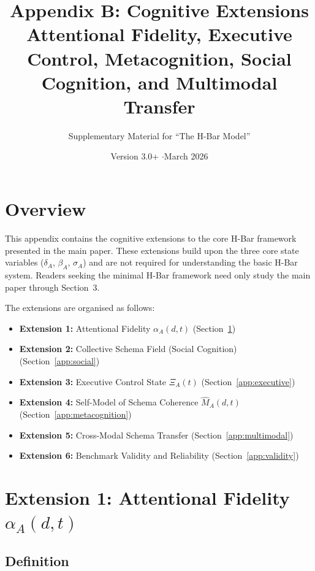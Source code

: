 \documentclass[11pt,a4paper]{article}
\title{\textbf{Appendix B: Cognitive Extensions}\\[6pt]
\large Attentional Fidelity, Executive Control, Metacognition, Social Cognition, and Multimodal Transfer}
\author{Supplementary Material for ``The H-Bar Model''}
\date{Version 3.0+ \quad$\cdot$\quad March 2026}
\begin{document}
\maketitle

\section*{Overview}\label{app:overview}

This appendix contains the cognitive extensions to the core H-Bar
framework presented in the main paper. These extensions build upon
the three core state variables ($\delta_A$, $\beta_A$, $\sigma_A$)
and are not required for understanding the basic H-Bar system.
Readers seeking the minimal H-Bar framework need only study the
main paper through Section~3.

The extensions are organised as follows:
\begin{itemize}[nosep]
\item \textbf{Extension 1:} Attentional Fidelity $\alpha_A(d,t)$ (Section~\ref{app:attention})
\item \textbf{Extension 2:} Collective Schema Field (Social Cognition) (Section~\ref{app:social})
\item \textbf{Extension 3:} Executive Control State $\Xi_A(t)$ (Section~\ref{app:executive})
\item \textbf{Extension 4:} Self-Model of Schema Coherence $\hat{M}_A(d,t)$ (Section~\ref{app:metacognition})
\item \textbf{Extension 5:} Cross-Modal Schema Transfer (Section~\ref{app:multimodal})
\item \textbf{Extension 6:} Benchmark Validity and Reliability (Section~\ref{app:validity})
\end{itemize}

\section{Extension 1: Attentional Fidelity $\alpha_A(d,t)$}\label{app:attention}

\subsection{Definition}
\end{document}
